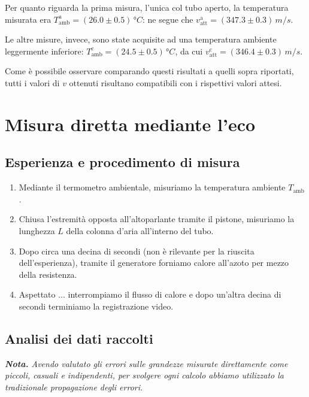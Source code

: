 \documentclass{article}
\begin{document}
Per quanto riguarda la prima misura, l'unica col tubo aperto,
la temperatura misurata era
$T_\text{amb}^\text{a} = (26.0\pm0.5)\,\unit{\degree C}$:
ne segue che $v_\text{att}^\text{a}=(347.3\pm0.3)\,\unit{m\per s}$.

Le altre misure, invece, sono state acquisite ad una
temperatura ambiente leggermente inferiore:
$T_\text{amb}^\text{c} = (24.5\pm0.5)\,\unit{\degree C}$,
da cui $v_\text{att}^\text{c} = (346.4\pm0.3)\,\unit{m\per s}$.

\vspace{2mm}
Come è possibile osservare comparando questi risultati a
quelli sopra riportati, tutti i valori di $v$ ottenuti
risultano compatibili con i rispettivi valori attesi.

\section{Misura diretta mediante l'eco}

\subsection{Esperienza e procedimento di misura}

\begin{enumerate}
  \item
    Mediante il termometro ambientale, misuriamo la temperatura ambiente
    $T_\text{amb}$.
  \item
    Chiusa l'estremità opposta all'altoparlante tramite il pistone,
    misuriamo la lunghezza $L$ della colonna d'aria all'interno del tubo.
  \item
    Dopo circa una decina di secondi (non è rilevante per la riuscita dell'esperienza),
    tramite il generatore forniamo calore all'azoto per mezzo della resistenza.
  \item
    Aspettato ... interrompiamo il flusso di calore e dopo
    un'altra decina di secondi terminiamo la registrazione video.
\end{enumerate}

\subsection{Analisi dei dati raccolti}
\emph{\textbf{Nota.}
Avendo valutato gli errori sulle grandezze misurate direttamente
come piccoli, casuali e indipendenti, per svolgere ogni calcolo
abbiamo utilizzato la tradizionale propagazione degli errori.
}

\end{document}
